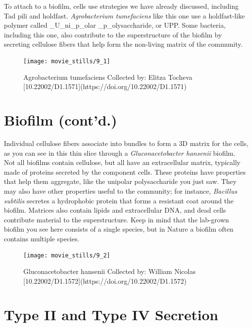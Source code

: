 \documentclass[]{tufte-book}
\begin{document}
To attach to a biofilm, cells use strategies we have already discussed,
including Tad pili and holdfast. \emph{Agrobacterium tumefaciens} like
this one use a holdfast-like polymer called \_U\_ni\_p\_olar
\_p\_olysaccharide, or UPP. Some bacteria, including this one, also
contribute to the superstructure of the biofilm by secreting cellulose
fibers that help form the non-living matrix of the community.

\begin{figure}
\texttt{[image: movie\_stills/9\_1]} \caption[Agrobacterium tumefaciens Collected by]{Agrobacterium tumefaciens Collected by: Elitza Tocheva [10.22002/D1.1571](https://doi.org/10.22002/D1.1571)}\label{fig:unnamed-chunk-151}
\end{figure}

\section{Biofilm (cont'd.)}\label{biofilm-contd.}

Individual cellulose fibers associate into bundles to form a 3D matrix
for the cells, as you can see in this thin slice through a
\emph{Gluconacetobacter hansenii} biofilm. Not all biofilms contain
cellulose, but all have an extracellular matrix, typically made of
proteins secreted by the component cells. These proteins have properties
that help them aggregate, like the unipolar polysaccharide you just saw.
They may also have other properties useful to the community; for
instance, \emph{Bacillus subtilis} secretes a hydrophobic protein that
forms a resistant coat around the biofilm. Matrices also contain lipids
and extracellular DNA, and dead cells contribute material to the
superstructure. Keep in mind that the lab-grown biofilm you see here
consists of a single species, but in Nature a biofilm often contains
multiple species.

\begin{figure}
\texttt{[image: movie\_stills/9\_2]} \caption[Gluconacetobacter hansenii Collected by]{Gluconacetobacter hansenii Collected by: William Nicolas [10.22002/D1.1572](https://doi.org/10.22002/D1.1572)}\label{fig:unnamed-chunk-152}
\end{figure}

\section{Type II and Type IV
Secretion}\label{type-ii-and-type-iv-secretion}
\end{document}
